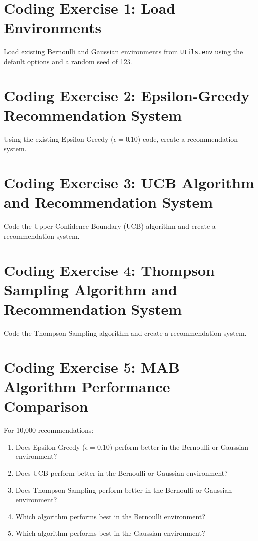 \documentclass[
  letterpaper,
  DIV=11,
  numbers=noendperiod]{scrreprt}
\providecommand{\tightlist}{%
  \setlength{\itemsep}{0pt}\setlength{\parskip}{0pt}}\usepackage{longtable,booktabs,array}
\begin{document}
\section{Coding Exercise 1: Load
Environments}\label{coding-exercise-1-load-environments}

Load existing Bernoulli and Gaussian environments from
\texttt{Utils.env} using the default options and a random seed of 123.

\section{Coding Exercise 2: Epsilon-Greedy Recommendation
System}\label{coding-exercise-2-epsilon-greedy-recommendation-system}

Using the existing Epsilon-Greedy (\(\epsilon = 0.10\)) code, create a
recommendation system.

\section{Coding Exercise 3: UCB Algorithm and Recommendation
System}\label{coding-exercise-3-ucb-algorithm-and-recommendation-system}

Code the Upper Confidence Boundary (UCB) algorithm and create a
recommendation system.

\section{Coding Exercise 4: Thompson Sampling Algorithm and
Recommendation
System}\label{coding-exercise-4-thompson-sampling-algorithm-and-recommendation-system}

Code the Thompson Sampling algorithm and create a recommendation system.

\section{Coding Exercise 5: MAB Algorithm Performance
Comparison}\label{coding-exercise-5-mab-algorithm-performance-comparison}

For 10,000 recommendations:

\begin{enumerate}
\def\labelenumi{\arabic{enumi}.}
\tightlist
\item
  Does Epsilon-Greedy (\(\epsilon = 0.10\)) perform better in the
  Bernoulli or Gaussian environment?
\item
  Does UCB perform better in the Bernoulli or Gaussian environment?
\item
  Does Thompson Sampling perform better in the Bernoulli or Gaussian
  environment?
\item
  Which algorithm performs best in the Bernoulli environment?
\item
  Which algorithm performs best in the Gaussian environment?
\end{enumerate}
\end{document}
